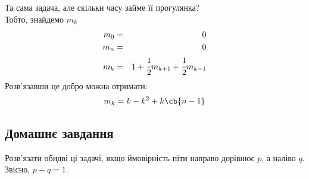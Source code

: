 \begin{tsk}
Та сама задача, але скільки часу займе її прогулянка?\\
Тобто, знайдемо $m_k$
\begin{eqnarray}
m_0 &=& 0\\
m_n &=& 0\\
m_k &=& 1 + \cfrac12 m_{k+1}  + \cfrac12 m_{k-1}
\end{eqnarray}
Розв’язавши це добро можна отримати:
\begin{equation}
m_k = k - k^2 + k \cb{n-1}
\end{equation}
\end{tsk}
\subsection{Домашнє завдання}
\begin{tsk}
Розв’язати обидві ці задачі, якщо ймовірність піти направо дорівнює $p$, а наліво $q$. Звісно, $p+q=1$.
\end{tsk}
\begin{tsk}
\end{tsk}
